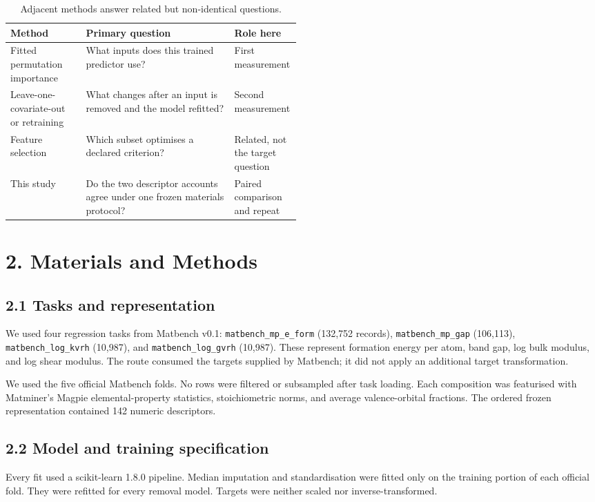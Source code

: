 \documentclass[10pt,a4paper]{article}
\begin{document}
\begin{table}[htbp]\centering\small
\caption{Adjacent methods answer related but non-identical questions.}
\begin{tabularx}{\linewidth}{@{}p{0.26\linewidth}X p{0.23\linewidth}@{}}\toprule
Method & Primary question & Role here\\\midrule
Fitted permutation importance & What inputs does this trained predictor use? & First measurement\\
Leave-one-covariate-out or retraining & What changes after an input is removed and the model refitted? & Second measurement\\
Feature selection & Which subset optimises a declared criterion? & Related, not the target question\\
This study & Do the two descriptor accounts agree under one frozen materials protocol? & Paired comparison and repeat\\\bottomrule
\end{tabularx}\end{table}

\section{2. Materials and Methods}
\subsection{2.1 Tasks and representation}
We used four regression tasks from Matbench v0.1: \texttt{matbench\_mp\_e\_form} (132,752 records), \texttt{matbench\_mp\_gap} (106,113), \texttt{matbench\_log\_kvrh} (10,987), and \texttt{matbench\_log\_gvrh} (10,987). These represent formation energy per atom, band gap, log bulk modulus, and log shear modulus. The route consumed the targets supplied by Matbench; it did not apply an additional target transformation.

We used the five official Matbench folds. No rows were filtered or subsampled after task loading. Each composition was featurised with Matminer's Magpie elemental-property statistics, stoichiometric norms, and average valence-orbital fractions. The ordered frozen representation contained 142 numeric descriptors.

\subsection{2.2 Model and training specification}
Every fit used a scikit-learn 1.8.0 pipeline. Median imputation and standardisation were fitted only on the training portion of each official fold. They were refitted for every removal model. Targets were neither scaled nor inverse-transformed.
\end{document}
